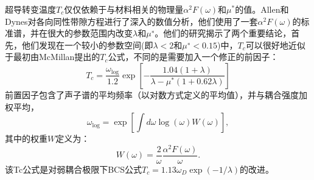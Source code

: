 超导转变温度$T_c$仅仅依赖于与材料相关的物理量$\alpha^2 F(\omega)$和$\mu^*$的值。Allen和Dynes\cite{allen1975transition}对各向同性带隙方程进行了深入的数值分析，他们使用了一套$\alpha^2 F(\omega)$的标准谱，并在很大的参数范围内改变$\lambda$和$\mu^∗$。他们的研究揭示了两个重要结论，首先，他们发现在一个较小的参数空间(即$\lambda<2$和$\mu^∗<0.15$)中，$T_c$可以很好地近似于最初由McMillan\cite{mcmillan1968transition}提出的$T_c$公式，不同的是需要加入一个修正的前因子：
\begin{equation}
  T_c = \frac{\omega_{\mathrm{log}}}{1.2}
  \exp{\left[ {-\frac{1.04(1+\lambda)}{\lambda-\mu^*(1+0.62\lambda)}} \right]}
\end{equation}
前置因子包含了声子谱的平均频率（以对数方式定义的平均值），并与耦合强度加权平均，
\begin{equation}
  \omega_\mathrm{log} = \exp \left[ {\int d\omega \log(\omega)W(\omega)} \right],
\end{equation}
其中的权重$W$定义为：
\begin{equation}
  W(\omega) = \frac{2}{\omega} \frac{\alpha^2 F(\omega)}{\omega}.
\end{equation}
该Tc公式是对弱耦合极限下BCS公式$T_c = 1.13 \omega_D \exp(−1/\lambda)$的改进。
